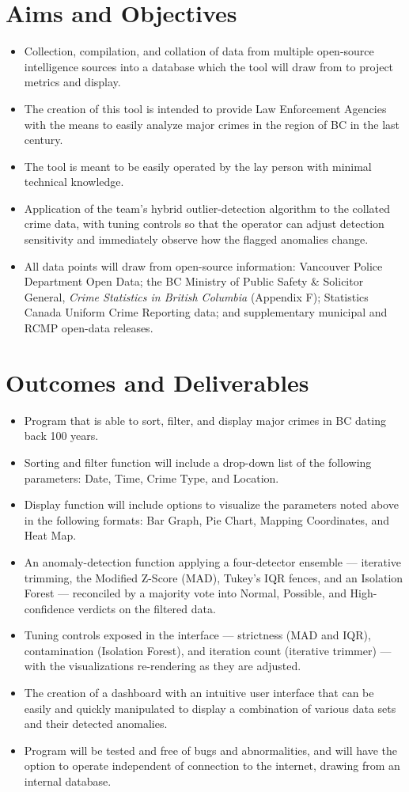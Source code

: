 \documentclass[10pt]{article}
\newcommand{\heading}[1]{\section*{#1}}
\begin{document}
\heading{Aims and Objectives}
\begin{itemize}
  \item Collection, compilation, and collation of data from multiple open-source intelligence sources into a database which the tool will draw from to project metrics and display.
  \item The creation of this tool is intended to provide Law Enforcement Agencies with the means to easily analyze major crimes in the region of BC in the last century.
  \item The tool is meant to be easily operated by the lay person with minimal technical knowledge.
  \item Application of the team's hybrid outlier-detection algorithm to the collated crime data, with tuning controls so that the operator can adjust detection sensitivity and immediately observe how the flagged anomalies change.
  \item All data points will draw from open-source information: Vancouver Police Department Open Data; the BC Ministry of Public Safety \& Solicitor General, \textit{Crime Statistics in British Columbia} (Appendix F); Statistics Canada Uniform Crime Reporting data; and supplementary municipal and RCMP open-data releases.
\end{itemize}

\heading{Outcomes and Deliverables}
\begin{itemize}
  \item Program that is able to sort, filter, and display major crimes in BC dating back 100 years.
  \item Sorting and filter function will include a drop-down list of the following parameters: Date, Time, Crime Type, and Location.
  \item Display function will include options to visualize the parameters noted above in the following formats: Bar Graph, Pie Chart, Mapping Coordinates, and Heat Map.
  \item An anomaly-detection function applying a four-detector ensemble --- iterative trimming, the Modified Z-Score (MAD), Tukey's IQR fences, and an Isolation Forest --- reconciled by a majority vote into Normal, Possible, and High-confidence verdicts on the filtered data.
  \item Tuning controls exposed in the interface --- strictness (MAD and IQR), contamination (Isolation Forest), and iteration count (iterative trimmer) --- with the visualizations re-rendering as they are adjusted.
  \item The creation of a dashboard with an intuitive user interface that can be easily and quickly manipulated to display a combination of various data sets and their detected anomalies.
  \item Program will be tested and free of bugs and abnormalities, and will have the option to operate independent of connection to the internet, drawing from an internal database.
\end{itemize}
\end{document}
